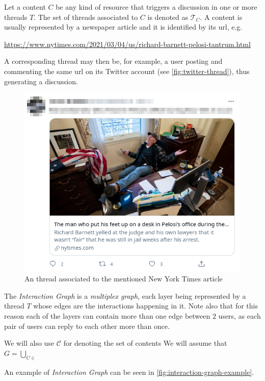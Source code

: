 Let a content $C$ be any kind of resource that triggers a discussion in one or
more threads $T$. The set of threads associated to $C$ is denoted as
$\mathcal{T}_{C} $. A content is usually represented by a newspaper article and
it is identified by its url, e.g.

	{\footnotesize
		\begin{center}
			\url{https://www.nytimes.com/2021/03/04/us/richard-barnett-pelosi-tantrum.html}
		\end{center}
	}

A corresponding thread may then be, for example, a user posting and commenting
the same url on its Twitter account (see \autoref{fig:twitter-thread}), thus
generating a discussion.

\begin{figure}
	\centering
	\includegraphics[width=0.6\linewidth]{tex/img/twitter_thread.png}
	\caption{An thread associated to the mentioned New York Times article}%
	\label{fig:twitter-thread}
\end{figure}

The \emph{Interaction Graph} is a \emph{multiplex graph}, each layer being
represented by a thread $T$ whose edges are the interactions happening in it.
Note also that for this reason each of the layers can contain more than one
edge between $2$ users, as each pair of users can reply to each other more than
once.

We will also use $\mathcal{C} $ for denoting the set of contents We will assume that $G = \bigcup _{C \in \mathcal{} } $

An example of \emph{Interaction Graph} can be seen in
\autoref{fig:interaction-graph-example}.

